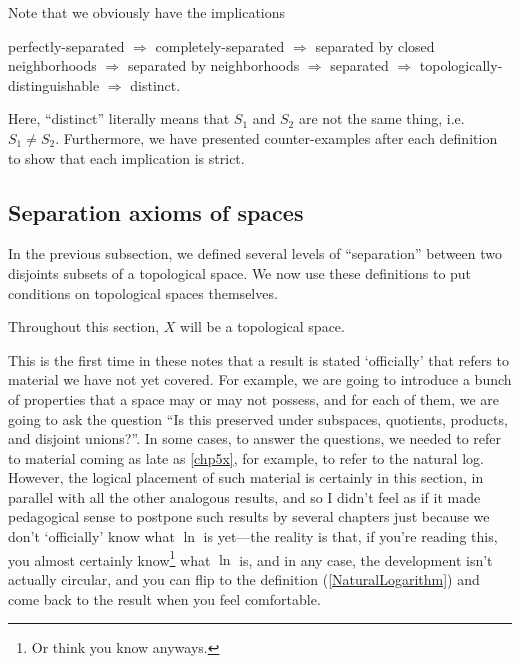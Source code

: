 Note that we obviously have the implications
\begin{textequation}
perfectly-separated $\Rightarrow$ completely-separated $\Rightarrow $ separated by closed neighborhoods $\Rightarrow $ separated by neighborhoods $\Rightarrow$ separated $\Rightarrow$ topologically-distinguishable $\Rightarrow$ distinct.
\end{textequation}
Here, ``distinct'' literally means that $S_1$ and $S_2$ are not the same thing, i.e. $S_1\neq S_2$.  Furthermore, we have presented counter-examples after each definition to show that each implication is strict.

\subsection{Separation axioms of spaces}\label{sbs3.6.2}

In the previous subsection, we defined several levels of ``separation'' between two disjoints subsets of a topological space.  We now use these definitions to put conditions on topological spaces themselves.

Throughout this section, $X$ will be a topological space.
\begin{displayquote}
This is the first time in these notes that a result is stated `officially' that refers to material we have not yet covered.  For example, we are going to introduce a bunch of properties that a space may or may not possess, and for each of them, we are going to ask the question ``Is this preserved under subspaces, quotients, products, and disjoint unions?''.  In some cases, to answer the questions, we needed to refer to material coming as late as \cref{chp5x}, for example, to refer to the natural log.  However, the logical placement of such material is certainly in this section, in parallel with all the other analogous results, and so I didn't feel as if it made pedagogical sense to postpone such results by several chapters just because we don't `officially' know what $\ln$ is yet---the reality is that, if you're reading this, you almost certainly know\footnote{Or think you know anyways.} what $\ln$ is, and in any case, the development isn't actually circular, and you can flip to the definition (\cref{NaturalLogarithm}) and come back to the result when you feel comfortable.
\end{displayquote}

